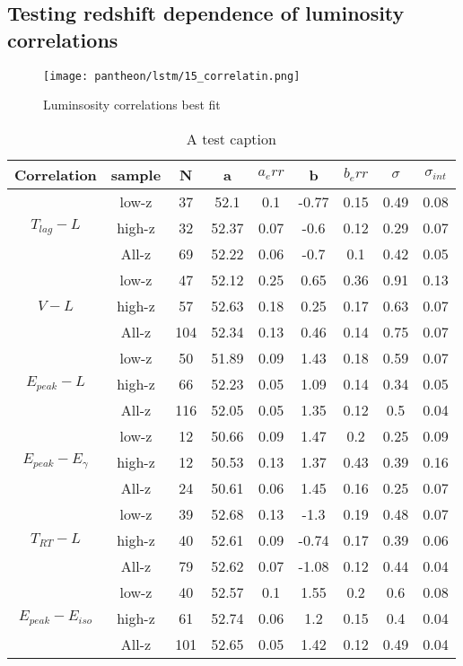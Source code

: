 \subsection{Testing redshift dependence of luminosity correlations}
\begin{figure}[h]
	\centering
	\texttt{[image: pantheon/lstm/15\_correlatin.png]}
	\caption{Luminsosity correlations best fit}
	\label{fig:correlation_lstm}
\end{figure}

\begin{table}
\centering
\begin{tabular}{|c|c|c|c|c|c|c|c|c|}
\hline
Correlation & sample & N & a & $a_err$ & b & $b_err$ & $\sigma$ & $\sigma_{int}$\\
\hline
\multirow{3}{*}{$T_{lag}-L$} & low-z & 37 & 52.1 & 0.1 & -0.77 & 0.15 & 0.49 & 0.08\\
\cline{2-9}
 & high-z & 32 & 52.37 & 0.07 & -0.6 & 0.12 & 0.29 & 0.07\\
\cline{2-9}
 & All-z & 69 & 52.22 & 0.06 & -0.7 & 0.1 & 0.42 & 0.05\\
\hline
\multirow{3}{*}{$V-L$} & low-z & 47 & 52.12 & 0.25 & 0.65 & 0.36 & 0.91 & 0.13\\
\cline{2-9}
 & high-z & 57 & 52.63 & 0.18 & 0.25 & 0.17 & 0.63 & 0.07\\
\cline{2-9}
 & All-z & 104 & 52.34 & 0.13 & 0.46 & 0.14 & 0.75 & 0.07\\
\hline
\multirow{3}{*}{$E_{peak}-L$} & low-z & 50 & 51.89 & 0.09 & 1.43 & 0.18 & 0.59 & 0.07\\
\cline{2-9}
 & high-z & 66 & 52.23 & 0.05 & 1.09 & 0.14 & 0.34 & 0.05\\
\cline{2-9}
 & All-z & 116 & 52.05 & 0.05 & 1.35 & 0.12 & 0.5 & 0.04\\
\hline
\multirow{3}{*}{$E_{peak}-E_{\gamma}$} & low-z & 12 & 50.66 & 0.09 & 1.47 & 0.2 & 0.25 & 0.09\\
\cline{2-9}
 & high-z & 12 & 50.53 & 0.13 & 1.37 & 0.43 & 0.39 & 0.16\\
\cline{2-9}
 & All-z & 24 & 50.61 & 0.06 & 1.45 & 0.16 & 0.25 & 0.07\\
\hline
\multirow{3}{*}{$T_{RT}-L$} & low-z & 39 & 52.68 & 0.13 & -1.3 & 0.19 & 0.48 & 0.07\\
\cline{2-9}
 & high-z & 40 & 52.61 & 0.09 & -0.74 & 0.17 & 0.39 & 0.06\\
\cline{2-9}
 & All-z & 79 & 52.62 & 0.07 & -1.08 & 0.12 & 0.44 & 0.04\\
\hline
\multirow{3}{*}{$E_{peak}-E_{iso}$} & low-z & 40 & 52.57 & 0.1 & 1.55 & 0.2 & 0.6 & 0.08\\
\cline{2-9}
 & high-z & 61 & 52.74 & 0.06 & 1.2 & 0.15 & 0.4 & 0.04\\
\cline{2-9}
 & All-z & 101 & 52.65 & 0.05 & 1.42 & 0.12 & 0.49 & 0.04\\
\hline
\end{tabular}
\caption{A test caption}
\label{table_pantheon_lstm}
\end{table}